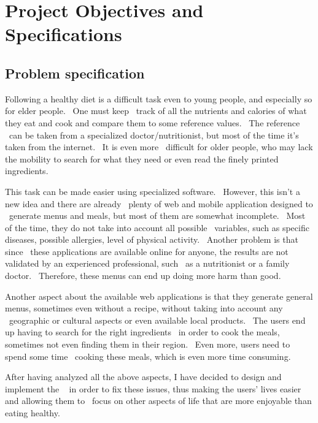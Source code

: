 \usepackage{graphicx}


\chapter{Project Objectives and Specifications}
\label{ch:specification}

\section{Problem specification}
\label{sec:specification-specification}

Following a healthy diet is a difficult task even to young people, and especially so for elder people. \
One must keep \
track of all the nutrients and calories of what they eat and cook and compare them to some reference values. \
The reference \
can be taken from a specialized doctor/nutritionist, but most of the time it's taken from the internet. \
It is even more \
difficult for older people, who may lack the mobility to search for what they need or even read the finely printed ingredients.

This task can be made easier using specialized software. \
However, this isn't a new idea and there are already \
plenty of web and mobile application designed to \
generate menus and meals, but most of them are somewhat incomplete. \
Most of the time, they do not take into account all possible \
variables, such as specific diseases, possible allergies, level of physical activity. \
Another problem is that since \
these applications are available online for anyone, the results are not validated by an experienced professional, such \
as a nutritionist or a family doctor. \
Therefore, these menus can end up doing more harm than good.

Another aspect about the available web applications is that they generate general menus, sometimes even without a recipe,
without taking into account any \
geographic or cultural aspects or even available local products. \
The users end up having to search for the right ingredients \
in order to cook the meals, sometimes not even finding them in their region. \
Even more, users need to spend some time \
cooking these meals, which is even more time consuming.

After having analyzed all the above aspects, I have decided to design and implement the \
\applicationTitle{} in order to fix these issues, thus making the users' lives easier and allowing them to \
focus on other aspects of life that are more enjoyable than eating healthy.


